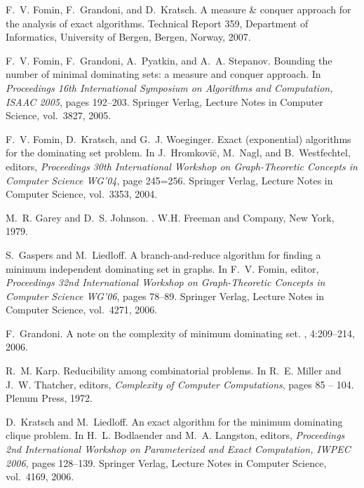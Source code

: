 \documentclass[fleqn]{stacs_proc}
\begin{document}
\begin{thebibliography}{10}
F.~V. Fomin, F.~Grandoni, and D.~Kratsch.
\newblock A measure \& conquer approach for the analysis of exact algorithms.
\newblock Technical Report 359, Department of Informatics, University of
  Bergen, Bergen, Norway, 2007.

F.~V. Fomin, F.~Grandoni, A.~Pyatkin, and A.~A. Stepanov.
\newblock Bounding the number of minimal dominating sets: a measure and conquer
  approach.
\newblock In {\em Proceedings 16th International Symposium on Algorithms and
  Computation, ISAAC 2005}, pages 192--203. Springer Verlag, Lecture Notes in
  Computer Science, vol.\ 3827, 2005.

F.~V. Fomin, D.~Kratsch, and G.~J. Woeginger.
\newblock Exact (exponential) algorithms for the dominating set problem.
\newblock In J.~Hromkovi\u{c}, M.~Nagl, and B.~Westfechtel, editors, {\em
  Proceedings 30th International Workshop on Graph-Theoretic Concepts in
  Computer Science WG'04}, page 245=256. Springer Verlag, Lecture Notes in
  Computer Science, vol.\ 3353, 2004.

M.~R. Garey and D.~S. Johnson.
.
\newblock W.H. Freeman and Company, New York, 1979.

S.~Gaspers and M.~Liedloff.
\newblock A branch-and-reduce algorithm for finding a minimum independent
  dominating set in graphs.
\newblock In F.~V. Fomin, editor, {\em Proceedings 32nd International Workshop
  on Graph-Theoretic Concepts in Computer Science WG'06}, pages 78--89.
  Springer Verlag, Lecture Notes in Computer Science, vol.\ 4271, 2006.

F.~Grandoni.
\newblock A note on the complexity of minimum dominating set.
, 4:209--214, 2006.

R.~M. Karp.
\newblock Reducibility among combinatorial problems.
\newblock In R.~E. Miller and J.~W. Thatcher, editors, {\em Complexity of
  Computer Computations}, pages 85 -- 104. Plenum Press, 1972.

D.~Kratsch and M.~Liedloff.
\newblock An exact algorithm for the minimum dominating clique problem.
\newblock In H.~L. Bodlaender and M.~A. Langston, editors, {\em Proceedings 2nd
  International Workshop on Parameterized and Exact Computation, IWPEC 2006},
  pages 128--139. Springer Verlag, Lecture Notes in Computer Science, vol.\
  4169, 2006.


\end{thebibliography}
\end{document}
